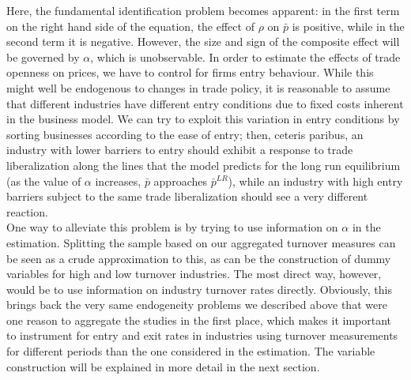Here, the fundamental identification problem becomes apparent: in the first term on the right hand side of the equation, the effect of $\rho$ on $\bar{p}$ is positive, while in the second term it is negative. However, the size and sign of the composite effect will be governed by $\alpha$, which is unobservable. In order to estimate the effects of trade openness on prices, we have to control for firms entry behaviour. While this might well be endogenous to changes in trade policy, it is reasonable to assume that different industries have different entry conditions due to fixed costs inherent in the business model. We can try to exploit this variation in entry conditions by sorting businesses according to the ease of entry; then, ceteris paribus, an industry with lower barriers to entry should exhibit a response to trade liberalization along the lines that the model predicts for the long run equilibrium (as the value of $\alpha$ increases, $\bar{p}$ approaches $\bar{p}^{LR}$), while an industry with high entry barriers subject to the same trade liberalization should see a very different reaction. \\
One way to alleviate this problem is by trying to use information on $\alpha$ in the estimation. Splitting the sample based on our aggregated turnover measures can be seen as a crude approximation to this, as can be the construction of dummy variables for high and low turnover industries. The most direct way, however, would be to use information on industry turnover rates directly. Obviously, this brings back the very same endogeneity problems we described above that were one reason to aggregate the studies in the first place, which makes it important to instrument for entry and exit rates in industries using turnover measurements for different periods than the one considered in the estimation. The variable construction will be explained in more detail in the next section.

